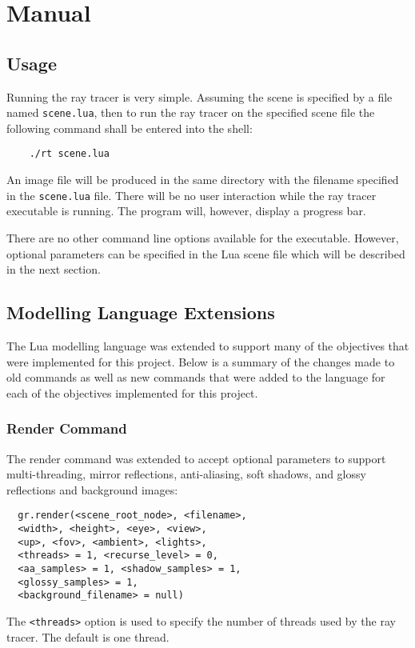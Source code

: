\chapter{Manual}

\section{Usage}
Running the ray tracer is very simple. Assuming the scene is specified by a file
named \verb|scene.lua|, then to run the ray tracer on the specified scene file
the following command shall be entered into the shell:
\begin{lstlisting}
    ./rt scene.lua
\end{lstlisting}
An image file will be produced in the same directory with the filename specified
in the  \verb|scene.lua| file. There will be no user interaction while the ray
tracer executable is running. The program will, however, display a progress bar.

There are no other command line options available for the executable. However,
optional parameters can be specified in the Lua scene file which will be
described in the next section.

\section{Modelling Language Extensions}
The Lua modelling language was extended to support many of the objectives that
were implemented for this project. Below is a summary of the changes made to old
commands as well as new commands that were added to the language for each of the
objectives implemented for this project.

\subsection*{Render Command}
The render command was extended to accept optional parameters to support
multi-threading, mirror reflections, anti-aliasing, soft shadows, and glossy
reflections and background images:
\begin{lstlisting}
  gr.render(<scene_root_node>, <filename>, 
  <width>, <height>, <eye>, <view>,
  <up>, <fov>, <ambient>, <lights>, 
  <threads> = 1, <recurse_level> = 0,
  <aa_samples> = 1, <shadow_samples> = 1, 
  <glossy_samples> = 1, 
  <background_filename> = null)
\end{lstlisting}
The \verb|<threads>| option is used to specify the number of threads used by the
ray tracer. The default is one thread.

